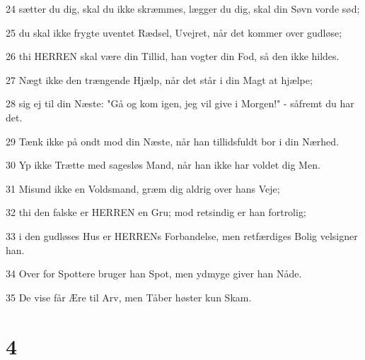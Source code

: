 \par 24 sætter du dig, skal du ikke skræmmes, lægger du dig, skal din Søvn vorde sød;
\par 25 du skal ikke frygte uventet Rædsel, Uvejret, når det kommer over gudløse;
\par 26 thi HERREN skal være din Tillid, han vogter din Fod, så den ikke hildes.
\par 27 Nægt ikke den trængende Hjælp, når det står i din Magt at hjælpe;
\par 28 sig ej til din Næste: "Gå og kom igen, jeg vil give i Morgen!" - såfremt du har det.
\par 29 Tænk ikke på ondt mod din Næste, når han tillidsfuldt bor i din Nærhed.
\par 30 Yp ikke Trætte med sagesløs Mand, når han ikke har voldet dig Men.
\par 31 Misund ikke en Voldsmand, græm dig aldrig over hans Veje;
\par 32 thi den falske er HERREN en Gru; mod retsindig er han fortrolig;
\par 33 i den gudløses Hus er HERRENs Forbandelse, men retfærdiges Bolig velsigner han.
\par 34 Over for Spottere bruger han Spot, men ydmyge giver han Nåde.
\par 35 De vise får Ære til Arv, men Tåber høster kun Skam.

\chapter{4}

